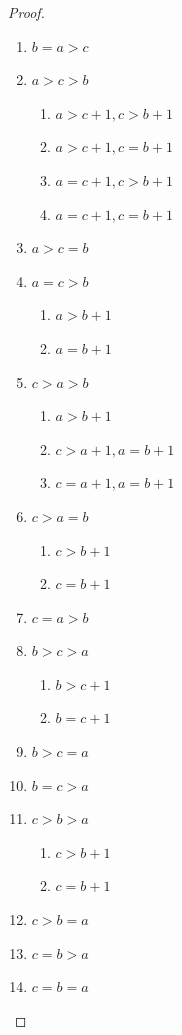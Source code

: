 \documentclass[12pt,a4paper]{article}
\begin{document}
\begin{proof}
\begin{enumerate}
  \item $b=a>c$


  \item $a>c>b$
    \begin{enumerate}
      \item $a>c+1, c>b+1$
      \item $a>c+1, c=b+1$
      \item $a=c+1, c>b+1$
      \item $a=c+1, c=b+1$
    \end{enumerate}

  \item $a>c=b$

  \item $a=c>b$
    \begin{enumerate}
      \item $a>b+1$
      \item $a=b+1$
    \end{enumerate}

  \item $c>a>b$
    \begin{enumerate}
      \item $a>b+1$
      \item $c>a+1, a=b+1$
      \item $c=a+1, a=b+1$
    \end{enumerate}

  \item $c>a=b$
    \begin{enumerate}
      \item $c>b+1$
      \item $c=b+1$
    \end{enumerate}

  \item $c=a>b$

  \item $b>c>a$
    \begin{enumerate}
      \item $b>c+1$
      \item $b=c+1$
    \end{enumerate}


  \item $b>c=a$
  
  \item $b=c>a$

  \item $c>b>a$
    \begin{enumerate}
      \item $c>b+1$
      \item $c=b+1$
    \end{enumerate}

  \item $c>b=a$

  \item $c=b>a$

  \item $c=b=a$

\end{enumerate}
\end{proof}
\end{document}
